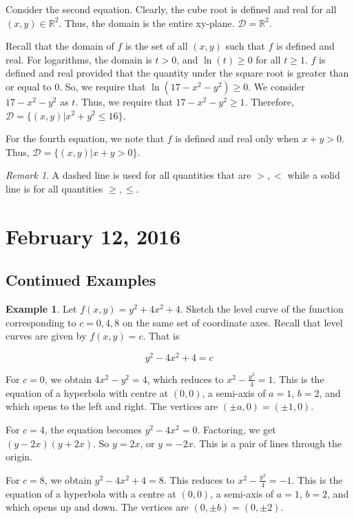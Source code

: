 \documentclass[11pt]{article}
\theoremstyle{plain} %
\theoremstyle{definition}
\theoremstyle{example}
\newtheorem*{example}{Example}
\theoremstyle{remark}
\newtheorem*{remark}{Remark}
\begin{document}
Consider the second equation. Clearly, the cube root is defined and real for all $(x,y) \in \mathbb R^2$. Thus, the domain is the entire xy-plane. $\mathcal D = \mathbb R^2$.

Recall that the domain of $f$ is the set of all $(x,y)$ such that $f$ is defined and real. For logarithms, the domain is $t > 0$, and $\ln (t) \geq 0$ for all $t \geq 1$. $f$ is defined and real provided that the quantity under the square root is  greater than or equal to 0. So, we require that $\ln \left(17 -x^2-y^2\right) \geq 0$. We consider $17-x^2-y^2$ as $t$. Thus, we require that $17-x^2-y^2 \geq 1$. Therefore, $\mathcal D = \{ (x, y) | x^2+y^2 \leq 16\}$.

For the fourth equation, we note that $f$ is defined and real only when $x+y > 0$. Thus, $\mathcal D = \{ (x, y) | x+y > 0\}$.

\begin{remark}
A dashed line is used for all quantities that are $>, <$ while a solid line is for all quantities $\geq, \leq$.
\end{remark}

\section{February 12, 2016}
\subsection{Continued Examples}

\begin{example}
Let $f(x,y) = y^2 + 4x^2+4$. Sketch the level curve of the function corresponding to $c=0, 4, 8$ on the same set of coordinate axes. Recall that level curves are given by $f(x,y) = c$.
That is

$$y^2-4x^2+4 = c$$


\end{example}

For $c=0$, we obtain $4x^2-y^2 = 4$, which reduces to $x^2-\frac{y^2}{4} = 1$. This is the equation of a hyperbola with centre at $(0,0)$, a semi-axis of $a=1$, $b=2$, and which opens to the left and right. The vertices are $(\pm a, 0) = (\pm 1, 0)$. 

For $c=4$, the equation becomes $y^2-4x^2 = 0$. Factoring, we get $(y-2x)(y+2x)$. So $y = 2x$, or $y=-2x$. This is a pair of lines through the origin.

For $c=8$, we obtain $y^2 -4x^2 +4 = 8$. This reduces to $x^2 -\frac{y^2}{4} = -1$. This is the equation of a hyperbola with a centre at $(0,0)$, a semi-axis of $a=1$, $b=2$, and which opens up and down. The vertices are $(0, \pm b) = (0, \pm 2)$.
\end{document}
